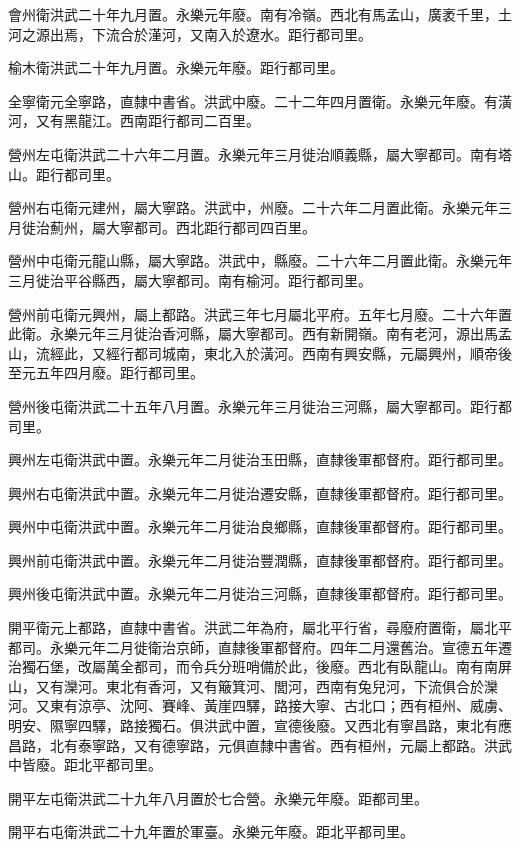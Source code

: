 會州衛洪武二十年九月置。永樂元年廢。南有冷嶺。西北有馬孟山，廣袤千里，土河之源出焉，下流合於漌河，又南入於遼水。距行都司里。

榆木衛洪武二十年九月置。永樂元年廢。距行都司里。

全寧衛元全寧路，直隸中書省。洪武中廢。二十二年四月置衛。永樂元年廢。有潢河，又有黑龍江。西南距行都司二百里。

營州左屯衛洪武二十六年二月置。永樂元年三月徙治順義縣，屬大寧都司。南有塔山。距行都司里。

營州右屯衛元建州，屬大寧路。洪武中，州廢。二十六年二月置此衛。永樂元年三月徙治薊州，屬大寧都司。西北距行都司四百里。

營州中屯衛元龍山縣，屬大寧路。洪武中，縣廢。二十六年二月置此衛。永樂元年三月徙治平谷縣西，屬大寧都司。南有榆河。距行都司里。

營州前屯衛元興州，屬上都路。洪武三年七月屬北平府。五年七月廢。二十六年置此衛。永樂元年三月徙治香河縣，屬大寧都司。西有新開嶺。南有老河，源出馬孟山，流經此，又經行都司城南，東北入於潢河。西南有興安縣，元屬興州，順帝後至元五年四月廢。距行都司里。

營州後屯衛洪武二十五年八月置。永樂元年三月徙治三河縣，屬大寧都司。距行都司里。

興州左屯衛洪武中置。永樂元年二月徙治玉田縣，直隸後軍都督府。距行都司里。

興州右屯衛洪武中置。永樂元年二月徙治遷安縣，直隸後軍都督府。距行都司里。

興州中屯衛洪武中置。永樂元年二月徙治良鄉縣，直隸後軍都督府。距行都司里。

興州前屯衛洪武中置。永樂元年二月徙治豐潤縣，直隸後軍都督府。距行都司里。

興州後屯衛洪武中置。永樂元年二月徙治三河縣，直隸後軍都督府。距行都司里。

開平衛元上都路，直隸中書省。洪武二年為府，屬北平行省，尋廢府置衛，屬北平都司。永樂元年二月徙衛治京師，直隸後軍都督府。四年二月還舊治。宣德五年遷治獨石堡，改屬萬全都司，而令兵分班哨備於此，後廢。西北有臥龍山。南有南屏山，又有灤河。東北有香河，又有簸箕河、閭河，西南有兔兒河，下流俱合於灤河。又東有涼亭、沈阿、賽峰、黃崖四驛，路接大寧、古北口；西有桓州、威虜、明安、隰寧四驛，路接獨石。俱洪武中置，宣德後廢。又西北有寧昌路，東北有應昌路，北有泰寧路，又有德寧路，元俱直隸中書省。西有桓州，元屬上都路。洪武中皆廢。距北平都司里。

開平左屯衛洪武二十九年八月置於七合營。永樂元年廢。距都司里。

開平右屯衛洪武二十九年置於軍臺。永樂元年廢。距北平都司里。

